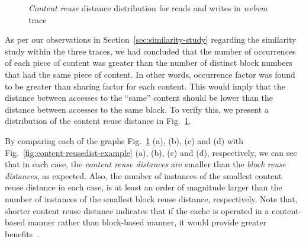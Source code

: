 \begin{figure}[t]
	\caption{\textit{Content reuse} distance distribution for reads and writes in \textit{webvm} trace}
	\label{fig:reusedist-dedup-read-write-distrib}
\end{figure}


As per our observations in Section~\ref{sec:similarity-study} regarding the similarity
study within the three traces, we had concluded that the number of occurrences of
each piece of content was greater than the number of distinct block numbers that
had the same piece of content. In other words, occurrence factor was found to 
be greater than sharing factor for each content. This would imply that the 
distance between accesses to the ``same'' content should be lower than the 
distance between accesses to the same block. To verify this, we present a distribution of 
the content reuse distance in Fig.~\ref{fig:reusedist-dedup-read-write-distrib}.

By comparing each of the graphs Fig.~\ref{fig:reusedist-dedup-read-write-distrib} (a),
(b), (c) and (d) with Fig.~\ref{fig:content-reusedist-example} (a), (b), (c)
and (d), respectively, we can see that in each case, the \textit{content reuse distances}
are smaller than the \textit{block reuse distances}, as expected. Also, the number of
instances of the smallest content reuse distance in each case, is at least an order
of magnitude larger than the number of instances of the smallest block reuse distance,
respectively. Note that, shorter content reuse distance indicates that if the cache
is operated in a content-based manner rather than block-based manner, it would provide
greater benefits~\cite{iodedup}.

